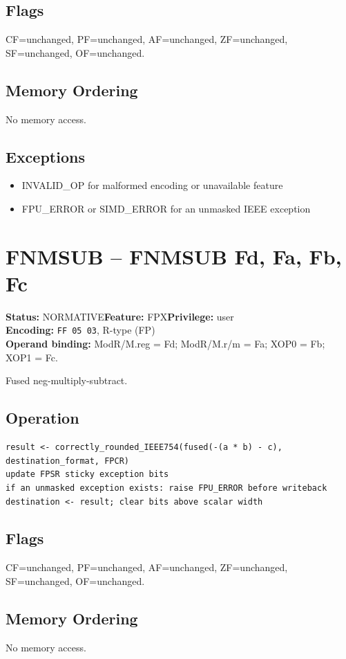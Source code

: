 \documentclass[10pt]{article}
\begin{document}
\subsection*{Flags}
CF=unchanged, PF=unchanged, AF=unchanged, ZF=unchanged, SF=unchanged, OF=unchanged.
\subsection*{Memory Ordering}
No memory access.
\subsection*{Exceptions}
\begin{itemize}
\item INVALID\_OP for malformed encoding or unavailable feature
\item FPU\_ERROR or SIMD\_ERROR for an unmasked IEEE exception
\end{itemize}
\clearpage

\section{FNMSUB -- FNMSUB Fd, Fa, Fb, Fc}
\textbf{Status:} NORMATIVE\quad \textbf{Feature:} FPX\quad \textbf{Privilege:} user\\
\textbf{Encoding:} \texttt{FF 05 03}, R-type (FP)\\
\textbf{Operand binding:} ModR/M.reg = Fd; ModR/M.r/m = Fa; XOP0 = Fb; XOP1 = Fc.

Fused neg-multiply-subtract.

\subsection*{Operation}
\begin{lstlisting}
result <- correctly_rounded_IEEE754(fused(-(a * b) - c), destination_format, FPCR)
update FPSR sticky exception bits
if an unmasked exception exists: raise FPU_ERROR before writeback
destination <- result; clear bits above scalar width
\end{lstlisting}
\subsection*{Flags}
CF=unchanged, PF=unchanged, AF=unchanged, ZF=unchanged, SF=unchanged, OF=unchanged.
\subsection*{Memory Ordering}
No memory access.
\end{document}

